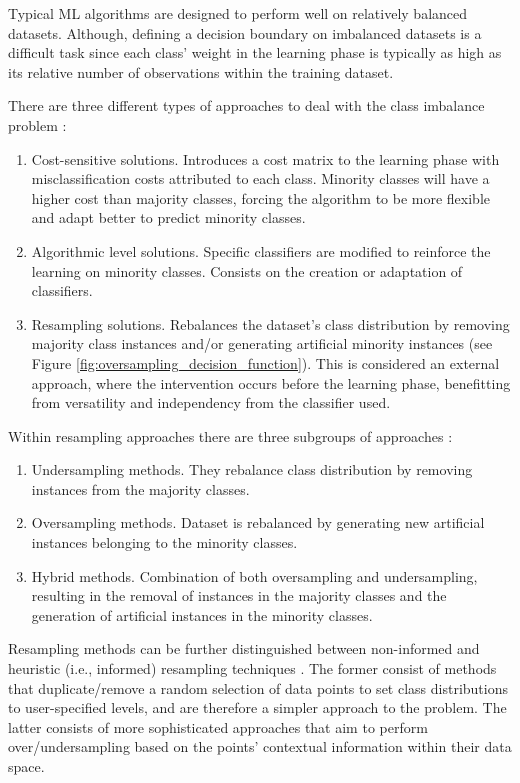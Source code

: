 \documentclass[parskip=full]{scrartcl}
\begin{document}
Typical ML algorithms are designed to perform well on relatively balanced
datasets. Although, defining a decision boundary on imbalanced datasets is a
difficult task since each class' weight in the learning phase is typically as
high as its relative number of observations within the training dataset.

There are three different types of approaches to deal with the class imbalance
problem \cite{Fernandez2013,Kaur2019}:
\begin{enumerate}
	\item Cost-sensitive solutions. Introduces a cost matrix to the learning phase with
	      misclassification costs attributed to each class. Minority classes will have a
	      higher cost than majority classes, forcing the algorithm to be more flexible
	      and adapt better to predict minority classes.
	\item Algorithmic level solutions. Specific classifiers are modified to reinforce the
	      learning on minority classes. Consists on the creation or adaptation of
	      classifiers.
	\item Resampling solutions. Rebalances the dataset's class distribution by removing
	      majority class instances and/or generating artificial minority instances (see
	      Figure \ref{fig:oversampling_decision_function}). This is considered an external  approach, where
	      the intervention occurs before the learning phase, benefitting from versatility
	      and independency from the classifier used.
\end{enumerate}

Within resampling approaches there are three subgroups of approaches
\cite{Fernandez2013,Kaur2019,Luengo2020}:
\begin{enumerate}
	\item Undersampling methods. They rebalance class distribution by removing instances
	      from the majority classes.
	\item Oversampling methods. Dataset is rebalanced by generating new artificial
	      instances belonging to the minority classes.
	\item Hybrid methods. Combination of both oversampling and undersampling, resulting
	      in the removal of instances in the majority classes and the generation of
	      artificial instances in the minority classes.
\end{enumerate}

Resampling methods can be further distinguished between non-informed and
heuristic (i.e., informed) resampling techniques \cite{Fernandez2013,Luengo2020,Garcia2016}. The
former consist of methods that duplicate/remove a random selection of data
points to set class distributions to user-specified levels, and are therefore a
simpler approach to the problem. The latter consists of more sophisticated
approaches that aim to perform over/undersampling based on the points'
contextual information within their data space.
\end{document}
